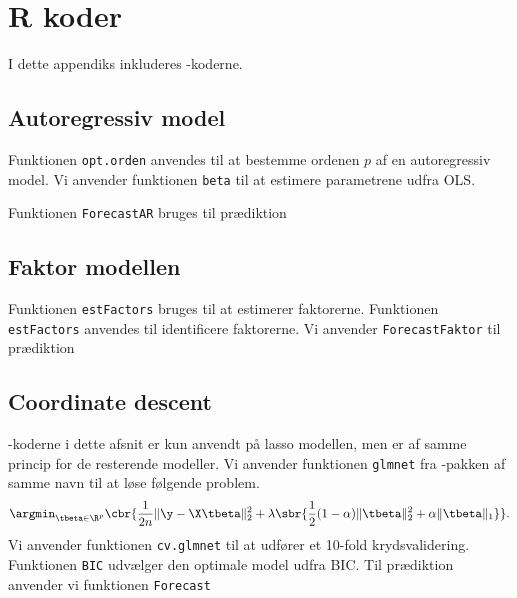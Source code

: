 \chapter{R koder} \label{app:r_koder}
I dette appendiks inkluderes \Rlang -koderne. 

\section{Autoregressiv model} \label{sec:auto}
Funktionen \texttt{opt.orden} anvendes til at bestemme ordenen $p$ af en autoregressiv model.  
%
Vi anvender funktionen \texttt{beta} til at estimere parametrene udfra OLS. 

Funktionen \texttt{ForecastAR} bruges til prædiktion

\section{Faktor modellen} \label{sec:faktor}
Funktionen \texttt{estFactors} bruges til at estimerer faktorerne.
%
Funktionen \texttt{estFactors} anvendes til identificere faktorerne. 
%
%
Vi anvender \texttt{ForecastFaktor} til prædiktion

\section{Coordinate descent} \label{sec:lasso}
\Rlang-koderne i dette afsnit er kun anvendt på lasso modellen, men er af samme princip for de resterende modeller.  
Vi anvender funktionen \texttt{glmnet} fra \Rlang-pakken  af samme navn til at løse følgende problem. 
\begin{align}
\argmin_{\tbeta \in \R^p} \cbr{ \frac{1}{2n} \Vert \y - \X \tbeta \Vert_2^2 + \lambda \sbr{\frac{1}{2}(1- \alpha) \Vert \tbeta \Vert_2^2 + \alpha \Vert \tbeta \Vert_1}}. \label{eq:4.2}
\end{align}
%
Vi anvender funktionen \texttt{cv.glmnet} til at udfører et 10-fold krydsvalidering. 
%
Funktionen \texttt{BIC} udvælger den optimale model udfra BIC. 
%
Til prædiktion anvender vi funktionen \texttt{Forecast} 


